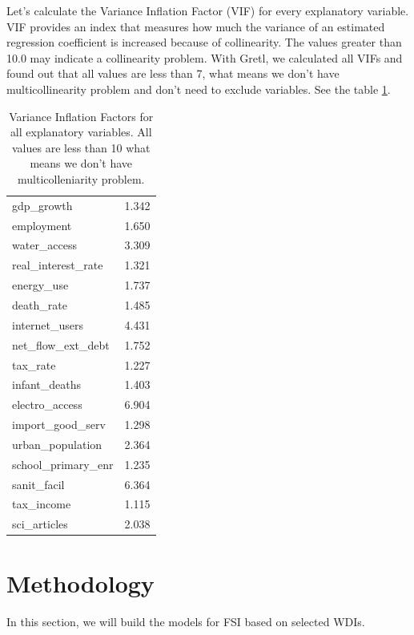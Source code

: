 \documentclass{article}
\begin{document}
Let's calculate the Variance Inflation Factor (VIF) for every explanatory variable. VIF provides an index that measures how much the variance of an estimated regression coefficient is increased because of collinearity. The values greater than 10.0 may indicate a collinearity problem. With Gretl, we calculated all VIFs and found out that all values are less than 7, what means we don't have multicollinearity problem and don't need to exclude variables. See the table \ref{table:vif}.


\begin{table}[H]
\begin{center}
\begin{tabular}{lr}
\toprule
        gdp\_growth  &   1.342 \\
        employment  &   1.650 \\
      water\_access  &   3.309 \\
real\_interest\_rate  &   1.321 \\
        energy\_use  &   1.737 \\
        death\_rate  &   1.485 \\
    internet\_users  &   4.431 \\
 net\_flow\_ext\_debt  &   1.752 \\
          tax\_rate  &   1.227 \\
     infant\_deaths  &   1.403 \\
    electro\_access  &   6.904 \\
  import\_good\_serv  &   1.298 \\
  urban\_population  &   2.364 \\
school\_primary\_enr  &   1.235 \\
       sanit\_facil  &   6.364 \\
        tax\_income  &   1.115 \\
      sci\_articles  &   2.038 \\
\bottomrule
\end{tabular}
\caption{Variance Inflation Factors for all explanatory variables. All values are less than 10 what means we don't have multicolleniarity problem.}
\label{table:vif}
\end{center}
\end{table}


\section{Methodology}
In this section, we will build the models for FSI based on selected WDIs. \\
\end{document}
